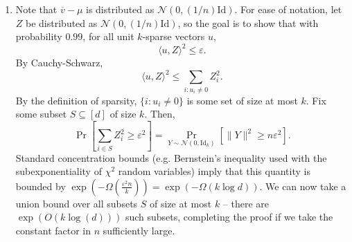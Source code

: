 \documentclass[11pt]{article}
\theoremstyle{definition}
\renewcommand{\epsilon}{\varepsilon}
\newcommand{\Id}{\mathrm{Id}}
\begin{document}
\phantom{pain}
\begin{enumerate}[label=(\alph*)]
  \item Note that $\overline{v}-\mu$ is distributed as $\mathcal{N}(0,(1/n)\Id)$. For ease of notation, let $Z$ be distributed as $\mathcal{N}(0,(1/n)\Id)$, so the goal is to show that with probability $0.99$, for all unit $k$-sparse vectors $u$,
  \[ \langle u, Z\rangle^2 \le \epsilon. \]
  By Cauchy-Schwarz,
  \[ \langle u, Z\rangle^2 \le \sum_{i : u_i \ne 0} Z_i^2. \]
  By the definition of sparsity, $\{i : u_i \ne 0\}$ is some set of size at most $k$. Fix some subset $S \subseteq [d]$ of size $k$. Then,
  \[ \Pr\left[ \sum_{i \in S} Z_i^2 \ge \epsilon^2 \right] = \Pr_{Y \sim \mathcal{N}(0,\Id_k)}\left[ \|Y\|^2 \ge n\epsilon^2 \right].  \]
  Standard concentration bounds (e.g. Bernstein's inequality used with the subexponentiality of $\chi^2$ random variables) imply that this quantity is bounded by $\exp\left(-\Omega\left(\frac{\epsilon^2 n}{k}\right)\right) = \exp(-\Omega(k \log d))$.
  We can now take a union bound over all subsets $S$ of size at most $k$ -- there are $\exp(O(k \log (d)))$ such subsets, completing the proof if we take the constant factor in $n$ sufficiently large.


\end{enumerate}
\end{document}
